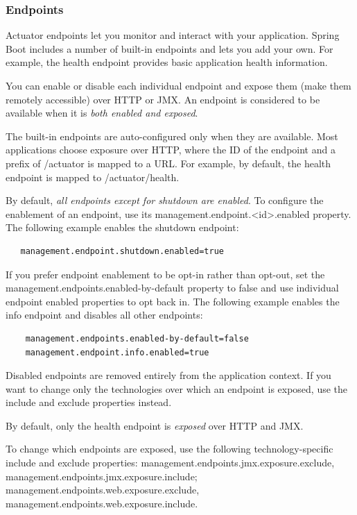 \documentclass{scrartcl}
\begin{document}
\subsubsection{Endpoints}

Actuator endpoints let you monitor and interact with your application. Spring Boot includes a number of built-in endpoints and lets you add your own. For example, the health endpoint provides basic application health information.

You can enable or disable each individual endpoint and expose them (make them remotely accessible) over HTTP or JMX. An endpoint is considered to be available when it is \textit{both enabled and exposed}.

The built-in endpoints are auto-configured only when they are available. Most applications choose exposure over HTTP, where the ID of the endpoint and a prefix of /actuator is mapped to a URL. For example, by default, the health endpoint is mapped to /actuator/health.

By default, \textit{all endpoints except for shutdown are enabled}. To configure the enablement of an endpoint, use its management.endpoint.<id>.enabled property. The following example enables the shutdown endpoint:

\begin{lstlisting}
   management.endpoint.shutdown.enabled=true
\end{lstlisting}

If you prefer endpoint enablement to be opt-in rather than opt-out, set the management.endpoints.enabled-by-default property to false and use individual endpoint enabled properties to opt back in. The following example enables the info endpoint and disables all other endpoints:

\begin{lstlisting}
    management.endpoints.enabled-by-default=false
    management.endpoint.info.enabled=true
\end{lstlisting}

Disabled endpoints are removed entirely from the application context. If you want to change only the technologies over which an endpoint is exposed, use the include and exclude properties instead.

By default, only the health endpoint is \textit{exposed} over HTTP and JMX.

To change which endpoints are exposed, use the following technology-specific include and exclude properties: management.endpoints.jmx.exposure.exclude,
management.endpoints.jmx.exposure.include; management.endpoints.web.exposure.exclude, management.endpoints.web.exposure.include.
\end{document}
